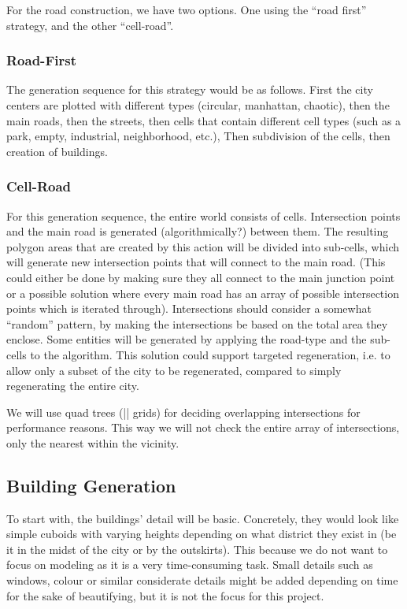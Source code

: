 For the road construction, we have two options.
One using the “road first” strategy, and the other “cell-road”.

\subsubsection{Road-First}
The generation sequence for this strategy would be as follows.
First the city centers are plotted with different types (circular, manhattan, chaotic), then the main roads, then the streets, then cells that contain different cell types (such as a park, empty, industrial, neighborhood, etc.), Then subdivision of the cells, then creation of buildings.

\subsubsection{Cell-Road}
For this generation sequence, the entire world consists of cells.
Intersection points and the main road is generated (algorithmically?) between them.
The resulting polygon areas that are created by this action will be divided into sub-cells, which will generate new intersection points that will connect to the main road. (This could either be done by making sure they all connect to the main junction point or a possible solution where every main road has an array of possible intersection points which is iterated through).
Intersections should consider a somewhat “random” pattern, by making the intersections be based on the total area they enclose.
Some entities will be generated by applying the road-type and the sub-cells to the algorithm.
This solution could support targeted regeneration, i.e. to allow only a subset of the city to be regenerated, compared to simply regenerating the entire city.

We will use quad trees (|| grids) for deciding overlapping intersections for performance reasons.
This way we will not check the entire array of intersections, only the nearest within the vicinity.

\subsection{Building Generation}
To start with, the buildings’ detail will be basic.
Concretely, they would look like simple cuboids with varying heights depending on what district they exist in (be it in the midst of the city or by the outskirts).
This because we do not want to focus on modeling as it is a very time-consuming task.
Small details such as windows, colour or similar considerate details might be added depending on time for the sake of beautifying, but it is not the focus for this project.
